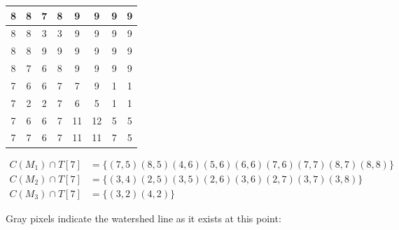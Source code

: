 \documentclass[fleqn]{article}
\begin{document}
\begin{description}
    \begin{tabular}{| c | c | c | c | c | c | c | c |}
        \hline
        8 & 8 & \cellcolor{green} 7 & 8 & 9 & 9 & 9 & 9 \\ \hline
        8 & 8 & \cellcolor{green} 3 & \cellcolor{green} 3 & 9 & 9 & 9 & 9 \\ \hline
        8 & 8 & 9 & 9 & 9 & 9 & 9 & 9 \\ \hline
        8 & \cellcolor{green} 7 & \cellcolor{green} 6 & 8 & 9 & 9 & 9 & 9 \\ \hline
        \cellcolor{green} 7 & \cellcolor{green} 6 & \cellcolor{green} 6 & \cellcolor{green} 7 & \cellcolor{green} 7 & 9 & \cellcolor{green} 1 & \cellcolor{green} 1 \\ \hline
        \cellcolor{green} 7 & \cellcolor{green} 2 & \cellcolor{green} 2 & \cellcolor{green} 7 & \cellcolor{green} 6 & \cellcolor{green} 5 & \cellcolor{green} 1 & \cellcolor{green} 1 \\ \hline
        \cellcolor{green} 7 & \cellcolor{green} 6 & \cellcolor{green} 6 & \cellcolor{green} 7 & 11 & 12 & \cellcolor{green} 5 & \cellcolor{green} 5 \\ \hline
        \cellcolor{green} 7 & \cellcolor{green} 7 & \cellcolor{green} 6 & \cellcolor{green} 7 & 11 & 11 & \cellcolor{green} 7 & \cellcolor{green} 5 \\
        \hline
    \end{tabular}

    \begin{align*}
        C \left (M_1 \right ) \cap T[7] &= \{ (7,5) (8,5) (4,6) (5,6) (6,6) (7,6) (7,7) (8,7) (8,8) \} \\
        C \left (M_2 \right ) \cap T[7] &= \{ (3,4) (2,5) (3,5) (2,6) (3,6) (2,7) (3,7) (3,8) \} \\
        C \left (M_3 \right ) \cap T[7] &= \{ (3,2) (4,2) \}
    \end{align*}

    Gray pixels indicate the watershed line as it exists at this point:


\end{description}
\end{document}
